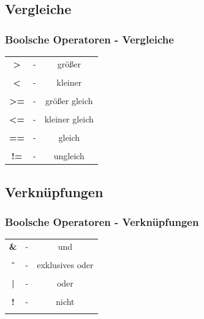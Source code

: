 \documentclass[final]{beamer}
\begin{document}
\subsection{Vergleiche}
\begin{frame}
	\frametitle{Boolsche Operatoren - Vergleiche}
	\begin{tabular}{c c c}
		\textbf{>}  & - & größer \\&&\\
		\textbf{<} & - & kleiner \\&&\\
		\textbf{>=} & - & größer gleich \\&&\\
		\textbf{<=}  & - &  kleiner gleich \\&&\\
		\textbf{==} & - & gleich \\&&\\
		\textbf{!=} & - & ungleich \\
	\end{tabular}
\end{frame}

\subsection{Verknüpfungen}
\begin{frame}
	\frametitle{Boolsche Operatoren - Verknüpfungen}
	\begin{tabular}{c c c}
		\textbf{\&}  & - & und \\&&\\
		\textbf{\^\ }  & - &  exklusives oder \\&&\\
		\textbf{|} & - & oder \\&&\\
		\textbf{!} & - & nicht \\&&\\
	\end{tabular}
\end{frame}
\end{document}
